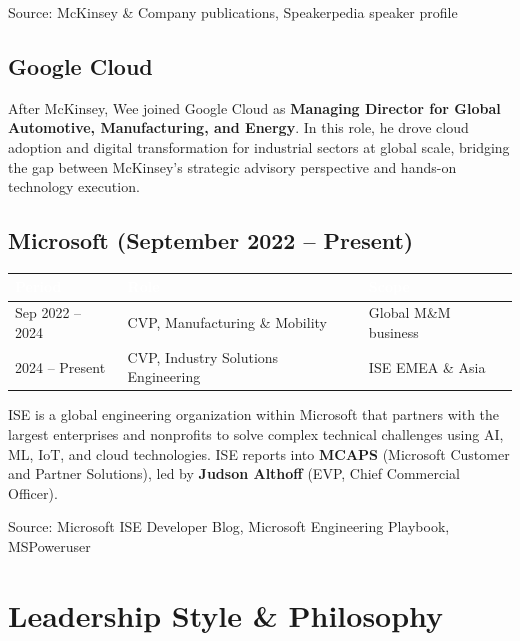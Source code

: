 \documentclass[11pt,a4paper]{article}
\begin{document}
\textcolor{msgray}{\scriptsize Source: McKinsey \& Company publications, Speakerpedia speaker profile}

\subsection{Google Cloud}

After McKinsey, Wee joined Google Cloud as \textbf{Managing Director for Global Automotive, Manufacturing, and Energy}. In this role, he drove cloud adoption and digital transformation for industrial sectors at global scale, bridging the gap between McKinsey's strategic advisory perspective and hands-on technology execution.

\subsection{Microsoft (September 2022 -- Present)}

\begin{center}
\begin{longtable}{L{3.5cm}L{6cm}L{4cm}}
\toprule
{}
\textcolor{white}{\textbf{Period}} & \textcolor{white}{\textbf{Role}} & \textcolor{white}{\textbf{Scope}} \\
\midrule
Sep 2022 -- 2024 & CVP, Manufacturing \& Mobility & Global M\&M business \\
2024 -- Present & CVP, Industry Solutions Engineering & ISE EMEA \& Asia \\
\bottomrule
\end{longtable}
\end{center}

ISE is a global engineering organization within Microsoft that partners with the largest enterprises and nonprofits to solve complex technical challenges using AI, ML, IoT, and cloud technologies. ISE reports into \textbf{MCAPS} (Microsoft Customer and Partner Solutions), led by \textbf{Judson Althoff} (EVP, Chief Commercial Officer).

\textcolor{msgray}{\scriptsize Source: Microsoft ISE Developer Blog, Microsoft Engineering Playbook, MSPoweruser}

\newpage

\section{Leadership Style \& Philosophy}
\end{document}
